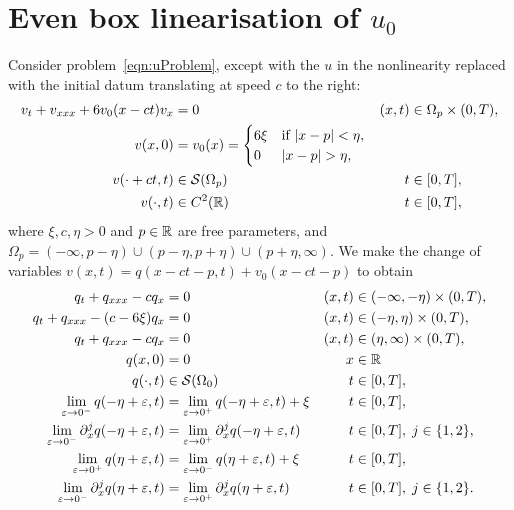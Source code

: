 \documentclass[11pt,reqno,oneside,a4paper]{article}
\begin{document}
\section{Even box linearisation of $u_0$}

Consider problem~\eqref{eqn:uProblem}, except with the $u$ in the nonlinearity replaced with the initial datum translating at speed $c$ to the right:
\begin{subequations} \label{eqn:vBoxProblem}
\begin{align}
    \label{eqn:vBoxProblem.PDE}
    v_t + v_{xxx} + 6v_0(x-ct)v_x &= 0 & (x,t) &\in \Omega_p\times(0,T), \\
    \label{eqn:vBoxProblem.InC}
    v(x,0) &= v_0(x) = \begin{cases} 6\xi & \mbox{if } \lvert x-p \rvert < \eta, \\ 0 & \lvert x-p \rvert > \eta, \end{cases} \\
    \label{eqn:vBoxProblem.BC}
    v(\cdot+ct,t) &\in \mathcal{S}(\Omega_p) & t &\in [0,T], \\
    \label{eqn:vBoxProblem.IfC}
    v(\cdot,t) &\in C^2(\mathbb R) & t &\in [0,T],
\end{align}
\end{subequations}
where $\xi,c,\eta>0$ and $p\in\mathbb R$ are free parameters, and $\Omega_p=(-\infty,p-\eta)\cup(p-\eta,p+\eta)\cup(p+\eta,\infty)$.
We make the change of variables $v(x,t) = q(x-ct-p,t)+v_0(x-ct-p)$ to obtain
\begin{subequations} \label{eqn:wBoxProblem}
\begin{align}
    \label{eqn:wBoxProblem.PDE.left}
    q_t + q_{xxx} - cq_x &= 0 & (x,t) &\in (-\infty,-\eta)\times(0,T), \\
    \label{eqn:wBoxProblem.PDE.center}
    q_t + q_{xxx} - (c-6\xi)q_x &= 0 & (x,t) &\in (-\eta,\eta)\times(0,T), \\
    \label{eqn:wBoxProblem.PDE.right}
    q_t + q_{xxx} - cq_x &= 0 & (x,t) &\in (\eta,\infty)\times(0,T), \\
    \label{eqn:wBoxProblem.InC}
    q(x,0) &= 0 & x &\in\mathbb R \\
    \label{eqn:wBoxProblem.BC}
    q(\cdot,t) &\in \mathcal{S}(\Omega_0) & t &\in [0,T], \\
    \label{eqn:wBoxProblem.IfC.left0}
    \lim_{\varepsilon\to0^-}q(-\eta+\varepsilon,t) &= \lim_{\varepsilon\to0^+}q(-\eta+\varepsilon,t) + \xi & t &\in [0,T], \\
    \label{eqn:wBoxProblem.IfC.left12}
    \lim_{\varepsilon\to0^-}\partial_x^jq(-\eta+\varepsilon,t) &= \lim_{\varepsilon\to0^+}\partial_x^jq(-\eta+\varepsilon,t) & t &\in [0,T],\; j\in\{1,2\}, \\
    \label{eqn:wBoxProblem.IfC.right0}
    \lim_{\varepsilon\to0^+}q(\eta+\varepsilon,t) &= \lim_{\varepsilon\to0^-}q(\eta+\varepsilon,t) + \xi & t &\in [0,T], \\
    \label{eqn:wBoxProblem.IfC.right12}
    \lim_{\varepsilon\to0^-}\partial_x^jq(\eta+\varepsilon,t) &= \lim_{\varepsilon\to0^+}\partial_x^jq(\eta+\varepsilon,t) & t &\in [0,T],\; j\in\{1,2\}.
\end{align}
\end{subequations}
\end{document}
